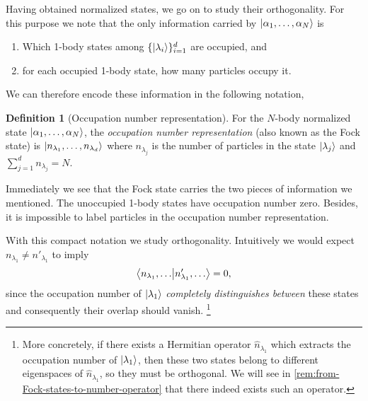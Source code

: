 \documentclass{article}
\theoremstyle{definition}
\newtheorem{dfn}{Definition}[section]
\theoremstyle{plain}
\numberwithin{equation}{section}
\begin{document}
    Having obtained normalized states, 
    we go on to study their orthogonality. 
    For this purpose we note that 
    the only information carried by $\ket{\alpha_1, \ldots ,\alpha_{N}}$ 
    is 
    \begin{enumerate}
        \item 
        Which 1-body states among $\{\ket{\lambda_{i}}\}_{i = 1}^{d}$ 
        are occupied, and 
        \item
        for each occupied 1-body state, 
        how many particles occupy it.
    \end{enumerate}

    We can therefore encode these information 
    in the following notation, 

    \begin{dfn}[Occupation number representation]
        For the $N$-body normalized state 
        $\ket{\alpha_1, \ldots ,\alpha_{N}}$, 
        the \textit{occupation number representation} 
        (also known as the Fock state) is 
        $\ket{n_{\lambda_{1}}, \ldots ,n_{\lambda_{d}}}$ 
        where $n_{\lambda_{j}}$ is the number of particles 
        in the state $\ket{\lambda_{j}}$ and 
        $\sum_{j=1}^{d}n_{\lambda_{j}}=N$.
    \end{dfn}

    Immediately we see that the Fock state 
    carries the two pieces of information we mentioned. 
    The unoccupied 1-body states have occupation number zero. 
    Besides, it is impossible to label particles 
    in the occupation number representation.

    With this compact notation we study orthogonality. 
    Intuitively we would expect 
    $n_{\lambda_{1}}\neq n'_{\lambda_{1}}$ to 
    imply 
    \begin{equation}
        \bra{n_{\lambda_{1}}, \ldots }\ket{n'_{\lambda_{1}}, \ldots }=0,
    \label{eqn:orthogonality-of-Fock-states}
    \end{equation}
    since the occupation number of $\ket{\lambda_{1}}$ 
    \textit{completely distinguishes between} these states and 
    consequently their overlap should vanish.
    \footnote{
        More concretely, if there exists a Hermitian operator 
        $\hat{n}_{\lambda_{1}}$ which extracts the occupation number 
        of $\ket{\lambda_{1}}$, then these two states belong to 
        different eigenspaces of $\hat{n}_{\lambda_{1}}$, so they 
        must be orthogonal. We will see 
        in \cref{rem:from-Fock-states-to-number-operator} 
        that there indeed 
        exists such an operator.
    }
\end{document}
